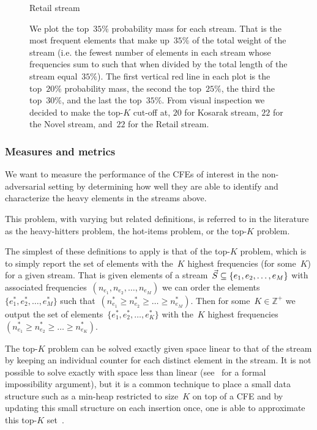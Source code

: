 \begin{figure}[h]
    \caption*{Retail stream}
  \endminipage
  \caption[Stream Frequent Elements.]{We plot the top~$35\%$ probability mass for each stream. That is the most frequent elements that make up~$35\%$ of the total weight of the stream (i.e. the fewest number of elements in each stream whose frequencies sum to such that when divided by the total length of the stream equal~$35\%$). The first vertical red line in each plot is the top~$20\%$ probability mass, the second the top~$25\%$, the third the top~$30\%$, and the last the top~$35\%$. From visual inspection we decided to make the top-$K$ cut-off at, $20$ for Kosarak stream, $22$ for the Novel stream, and~$22$ for the Retail stream.}
  \label{fig:stream_pm} 
\end{figure}

\subsubsection{Measures and metrics} We want to measure the performance of the CFEs of interest in the non-adversarial setting by determining how well they are able to identify and characterize the heavy elements in the streams above. %

This problem, with varying but related definitions, is referred to in the literature as the heavy-hitters problem, the hot-items problem, or the top-$K$ problem. 

The simplest of these definitions to apply is that of the top-$K$ problem, which is to simply report the set of elements with the~$K$ highest frequencies (for some~$K$) for a given stream. That is given elements of a stream~$\vec{S} \subseteq  \{ e_1,e_2,\ldots,e_M \}$ with associated frequencies~$(n_{e_1},n_{e_2},\ldots,n_{e_M})$ we can order the elements~$\{ e^{*}_{1},e^{*}_{2},\ldots,e^{*}_{M} \}$ such that~$(n^{*}_{e_1} \geq n^{*}_{e_2} \geq \ldots \geq n^{*}_{e_M})$. Then for some~$K \in \mathbb{Z}^{+}$ we output the set of elements~$\{ e^{*}_{1},e^{*}_{2},\ldots,e^{*}_{K} \}$ with the~$K$ highest frequencies~$(n^{*}_{e_1} \geq n^{*}_{e_2} \geq \ldots \geq n^{*}_{e_K})$.

The top-$K$ problem can be solved exactly given space linear to that of the stream by keeping an individual counter for each distinct element in the stream. It is not possible to solve exactly with space less than linear (see~\cite{Roughgarden_Valiant} for a formal impossibility argument), but it is a common technique to place a small data structure such as a min-heap restricted to size~$K$ on top of a CFE and by updating this small structure on each insertion once, one is able to approximate this top-$K$ set~\cite{yang2019heavykeeper,mandal2018topkapi,metwally2006}.


